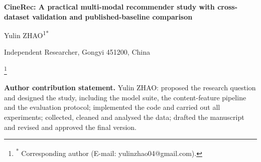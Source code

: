 \documentclass[11pt,a4paper]{article}
\newcommand{\authfont}{\fontsize{12}{14}\selectfont}
\newcommand{\affilfont}{\fontsize{9}{11}\selectfont}
\newcommand{\contribfont}{\fontsize{9}{12}\selectfont}
\newcommand\blfootnote[1]{%
  \begingroup
  \renewcommand\thefootnote{}\footnote{#1}%
  \addtocounter{footnote}{-1}%
  \endgroup
}
\begin{document}
\begin{center}
  {\fontsize{18}{22}\selectfont\bfseries
   CineRec: A practical multi-modal recommender study with cross-dataset
   validation and published-baseline comparison\par}
  \vspace{8pt}
  {\authfont Yulin ZHAO\textsuperscript{1*}\par}
\end{center}
\vspace{4pt}
{\affilfont 1 Independent Researcher, Gongyi 451200, China\par}
\blfootnote{\textsuperscript{*} Corresponding author (E-mail: yulinzhao04@gmail.com).}

\vspace{6pt}
{\contribfont
\textbf{Author contribution statement.} Yulin ZHAO: proposed the research
question and designed the study, including the model suite, the content-feature
pipeline and the evaluation protocol; implemented the code and carried out all
experiments; collected, cleaned and analysed the data; drafted the manuscript
and revised and approved the final version.\par}

\end{document}
